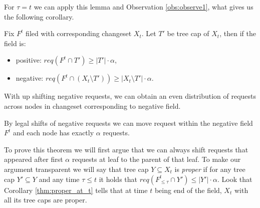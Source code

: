 For $\tau = t$ we can apply this lemma and Observation \ref{obs:observe1}, 
what gives us the following corollary.
\begin{corollary}
Fix $F^t$ filed with corresponding changeset $X_t$. Let $T'$ be tree cap of 
$X_t$, then if the field is:
 \begin{itemize}
  \item positive: $req(F^t \cap T') \geq |T'| \cdot \alpha$,
  \item negative: $req(F^t \cap (X_t \setminus T')) \geq |X_t \setminus 
T'| \cdot \alpha$.
 \end{itemize}
 \label{thm:proper_at_t}
\end{corollary}

With up shifting negative requests, we can obtain an even distribution of 
requests across nodes in changeset corresponding to negative field.
\begin{theorem}
By legal shifts of negative requests we can move request within the 
negative field $F^t$ 
and each node has exactly $\alpha$ requests.
\label{thm:legal_shifting_up}
\end{theorem}
To prove this theorem we will first argue that we can always 
shift requests that appeared after first $\alpha$ requests at leaf to the 
parent of that leaf. To make our argument transparent we will say that tree 
cap $Y 
\subseteq X_t$ is \textit{proper} if for any tree cap $Y' \subseteq Y$ and any 
time $\tau \leq t$ it holds that $req(F^t_{\leq \tau} \cap Y') \leq |Y'| \cdot 
\alpha$. Look that Corollary \ref{thm:proper_at_t} tells that at time $t$ 
being end of the field, 
$X_t$ with all its tree caps are proper.

